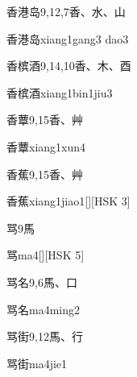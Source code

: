 \begin{entry}{香港岛}{9,12,7}{⾹、⽔、⼭}
  \begin{phonetics}{香港岛}{xiang1gang3 dao3}
  \end{phonetics}
\end{entry}

\begin{entry}{香槟酒}{9,14,10}{⾹、⽊、⾣}
  \begin{phonetics}{香槟酒}{xiang1bin1jiu3}
  \end{phonetics}
\end{entry}

\begin{entry}{香蕈}{9,15}{⾹、⾋}
  \begin{phonetics}{香蕈}{xiang1xun4}
  \end{phonetics}
\end{entry}

\begin{entry}{香蕉}{9,15}{⾹、⾋}
  \begin{phonetics}{香蕉}{xiang1jiao1}[][HSK 3]
  \end{phonetics}
\end{entry}

\begin{entry}{骂}{9}{⾺}
  \begin{phonetics}{骂}{ma4}[][HSK 5]
  \end{phonetics}
\end{entry}

\begin{entry}{骂名}{9,6}{⾺、⼝}
  \begin{phonetics}{骂名}{ma4ming2}
  \end{phonetics}
\end{entry}

\begin{entry}{骂街}{9,12}{⾺、⾏}
  \begin{phonetics}{骂街}{ma4jie1}
  \end{phonetics}
\end{entry}

